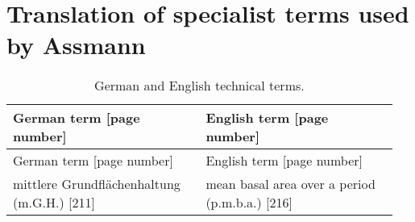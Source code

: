 \section{Translation of specialist terms used by Assmann}

\begin{singlespace}
  {\tabulinesep=2mm
    \begin{longtabu}{p{0.475\linewidth} p{0.475\linewidth}}
      \caption{German \parencite{Assmann1961} and English \parencite{Assmann1970} technical terms.} \\
      \toprule
      German term [page number] & English term [page number] \\
      \midrule
      \endfirsthead
      German term [page number] & English term [page number] \\
      \midrule
      \endhead
      \bottomrule
      \endlastfoot
      mittlere Grundflächenhaltung (m.G.H.) [211] & mean basal area over a period (p.m.b.a.) [216] \\
      
    \end{longtabu}
  }
\end{singlespace}

